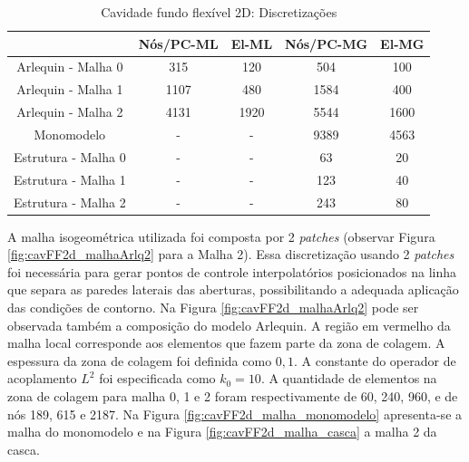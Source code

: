 	\begin{center}
		\begin{table}[!htbp]
			\caption{Cavidade fundo flexível 2D: Discretizações}
			\centering
			\begin{tabular}{ccccc} 
				\toprule
				\ &  Nós/PC-ML & El-ML & Nós/PC-MG & El-MG  \\ 
				\midrule \midrule
				Arlequin - Malha 0 & 315 & 120 & 504 & 100 \\ 
				\midrule
				Arlequin - Malha 1 & 1107 & 480 & 1584 & 400\\
				\midrule
				Arlequin - Malha 2 & 4131 & 1920 & 5544 & 1600\\
				\midrule
				Monomodelo & - & - & 9389 & 4563\\
				\midrule
				Estrutura - Malha 0 & - & - &  63 & 20\\
				\midrule
				Estrutura - Malha 1 & - & - &  123 & 40\\
				\midrule
				Estrutura - Malha 2 & - & - &  243 & 80 \\
				\midrule
			\end{tabular}
			\label{tab:CF2DD}
		\end{table}
	\end{center}

A malha isogeométrica utilizada foi composta por 2 \textit{patches} (observar Figura \ref{fig:cavFF2d_malhaArlq2} para a Malha 2). Essa discretização usando 2 \textit{patches} foi necessária para gerar pontos de controle interpolatórios posicionados na linha que separa as paredes laterais das aberturas, possibilitando a adequada aplicação das condições de contorno. Na Figura \ref{fig:cavFF2d_malhaArlq2} pode ser observada também a composição do modelo Arlequin. A região em vermelho da malha local corresponde aos elementos que fazem parte da zona de colagem.  A espessura da zona de colagem foi definida como $0,1$. A constante do operador de acoplamento $L^{2}$ foi especificada como $k_{0} = 10$. A quantidade de elementos na zona de colagem para malha 0, 1 e 2  foram respectivamente de 60, 240, 960, e de nós 189, 615 e 2187. Na Figura \ref{fig:cavFF2d_malha_monomodelo} apresenta-se a malha do monomodelo e na Figura \ref{fig:cavFF2d_malha_casca} a malha 2 da casca.

